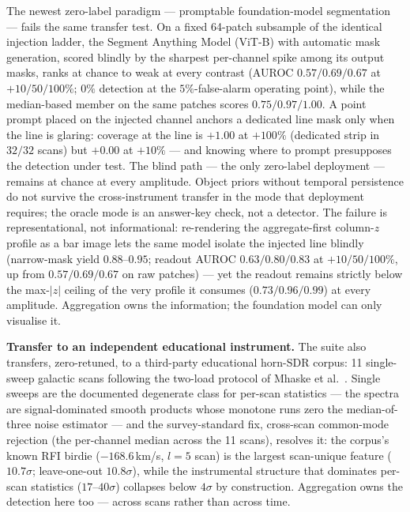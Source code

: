 \documentclass[journal]{IEEEtran}
\begin{document}
The newest zero-label paradigm --- promptable foundation-model segmentation
\cite{yang2025sam} --- fails the same transfer test.  On a fixed 64-patch
subsample of the identical injection ladder, the Segment Anything Model
(ViT-B) with automatic mask generation, scored blindly by the sharpest
per-channel spike among its output masks, ranks at chance to weak at every
contrast (AUROC $0.57/0.69/0.67$ at $+10/50/100\%$; $0\%$ detection at the
$5\%$-false-alarm operating point), while the median-based member on the
same patches scores $0.75/0.97/1.00$.  A point prompt placed on the injected channel anchors a dedicated line mask
only when the line is glaring: coverage at the line is $+1.00$ at $+100\%$
(dedicated strip in $32/32$ scans) but $+0.00$ at $+10\%$ --- and knowing
where to prompt presupposes the detection under test.  The blind path ---
the only zero-label deployment --- remains at chance at every amplitude.
Object priors without temporal persistence do not survive the
cross-instrument transfer in the mode that deployment requires; the oracle
mode is an answer-key check, not a detector.  The failure is
representational, not informational: re-rendering the aggregate-first
column-$z$ profile as a bar image lets the same model isolate the injected
line blindly (narrow-mask yield $0.88$--$0.95$; readout AUROC
$0.63/0.80/0.83$ at $+10/50/100\%$, up from $0.57/0.69/0.67$ on raw
patches) --- yet the readout remains strictly below the max-$|z|$ ceiling
of the very profile it consumes ($0.73/0.96/0.99$) at every amplitude.
Aggregation owns the information; the foundation model can only visualise
it.

\textbf{Transfer to an independent educational instrument.}  The suite also
transfers, zero-retuned, to a third-party educational horn-SDR corpus: 11
single-sweep galactic scans following the two-load protocol of Mhaske et
al.~\cite{mhaske2022}.  Single sweeps are the documented degenerate class
for per-scan statistics --- the spectra are signal-dominated smooth
products whose monotone runs zero the median-of-three noise estimator ---
and the survey-standard fix, cross-scan common-mode rejection (the
per-channel median across the 11 scans), resolves it:  the corpus's known
RFI birdie ($-168.6$\,km/s, $l=5$ scan) is the largest scan-unique feature
($10.7\sigma$; leave-one-out $10.8\sigma$), while the instrumental
structure that dominates per-scan statistics ($17$--$40\sigma$) collapses
below $4\sigma$ by construction.  Aggregation owns the detection here too
--- across scans rather than across time.
\end{document}
